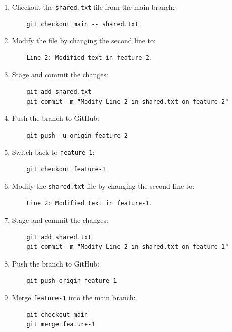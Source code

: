 \documentclass[a4paper,12pt]{article}
\begin{document}
\begin{enumerate}
    \item Checkout the \texttt{shared.txt} file from the main branch:
    \begin{verbatim}
    git checkout main -- shared.txt
    \end{verbatim}
    
    \item Modify the file by changing the second line to:
    \begin{verbatim}
    Line 2: Modified text in feature-2.
    \end{verbatim}
    
    \item Stage and commit the changes:
    \begin{verbatim}
    git add shared.txt
    git commit -m "Modify Line 2 in shared.txt on feature-2"
    \end{verbatim}
    
    \item Push the branch to GitHub:
    \begin{verbatim}
    git push -u origin feature-2
    \end{verbatim}
    
    \item Switch back to \texttt{feature-1}:
    \begin{verbatim}
    git checkout feature-1
    \end{verbatim}
    
    \item Modify the \texttt{shared.txt} file by changing the second line to:
    \begin{verbatim}
    Line 2: Modified text in feature-1.
    \end{verbatim}
    
    \item Stage and commit the changes:
    \begin{verbatim}
    git add shared.txt
    git commit -m "Modify Line 2 in shared.txt on feature-1"
    \end{verbatim}
    
    \item Push the branch to GitHub:
    \begin{verbatim}
    git push origin feature-1
    \end{verbatim}
    
    \item Merge \texttt{feature-1} into the main branch:
    \begin{verbatim}
    git checkout main
    git merge feature-1
    \end{verbatim}
    

\end{enumerate}
\end{document}
